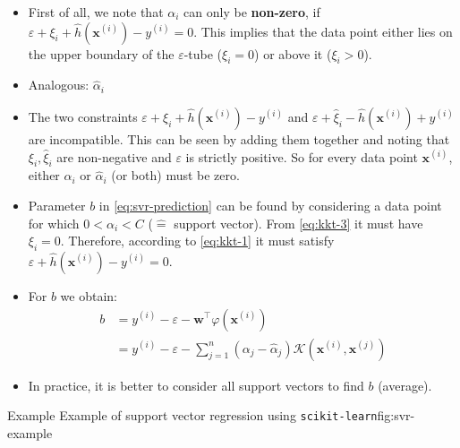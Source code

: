\begin{frame}
	\begin{itemize}
		\item First of all, we note that $\alpha_i$ can only be \textbf{non-zero}, if $\varepsilon + \xi_i + \widehat{h}(\bm{x}^{(i)}) - y^{(i)} = 0$. This implies that the data point either lies
			on the upper boundary of the $\varepsilon$-tube ($\xi_i = 0$) or above it ($\xi_i > 0$).
		\item Analogous: $\widehat{\alpha}_i$
		\item The two constraints $\varepsilon + \xi_i + \widehat{h}(\bm{x}^{(i)}) - y^{(i)}$ and $\varepsilon + \widehat{\xi}_i - \widehat{h}(\bm{x}^{(i)}) + y^{(i)}$ are incompatible.
			This can be seen by adding them together and noting that $\xi_i, \widehat{\xi}_i$ are non-negative and $\varepsilon$ is strictly positive. So for every data point
			$\bm{x}^{(i)}$, either $\alpha_i$ or $\widehat{\alpha}_i$ (or both) must be zero.
		\item Parameter $b$ in \cref{eq:svr-prediction} can be found by considering a data point for which $0 < \alpha_i < C$ ($\widehat{=}$ support vector).
			From \cref{eq:kkt-3} it must have $\xi_i = 0$. Therefore, according to \cref{eq:kkt-1} it must satisfy $\varepsilon + \widehat{h}(\bm{x}^{(i)}) - y^{(i)} = 0$.
		\item For $b$ we obtain:
		\begin{align}
			b 
				&= y^{(i)} - \varepsilon - \bm{w}^{\intercal} \varphi(\bm{x}^{(i)}) \\[1mm]
				&= y^{(i)} - \varepsilon - \sum_{j=1}^n (\alpha_j - \widehat{\alpha}_j) \mathcal{K}(\bm{x}^{(i)}, \bm{x}^{(j)})
		\end{align}
		\item In practice, it is better to consider all support vectors to find $b$ (average).
	\end{itemize}
\end{frame}


\begin{dwHeaderFrame}{Example}
		{Example of support vector regression using \texttt{scikit-learn}}{fig:svr-example}
\end{dwHeaderFrame}


